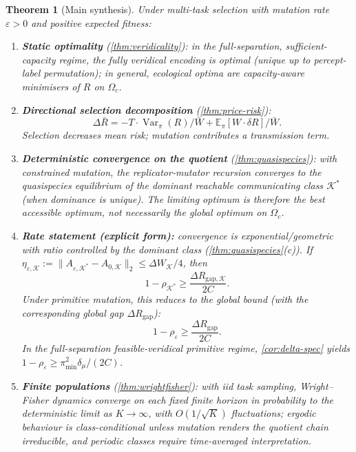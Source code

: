 \documentclass[12pt]{article}
\newtheorem{theorem}{Theorem}[section]
\newcommand{\dmu}{\delta_\mu}
\newcommand{\pimin}{\pi_{\min}}
\newcommand{\Rbar}{\bar{R}}
\newcommand{\Wbar}{\bar{W}}
\newcommand{\E}{\mathbb{E}}
\newcommand{\Var}{\operatorname{Var}}
\begin{document}
\begin{theorem}[Main synthesis]\label{thm:synthesis}
Under multi-task selection with mutation rate $\varepsilon > 0$ and positive expected fitness:

\begin{enumerate}[label=(\alph*)]
\item \textbf{Static optimality} (\cref{thm:veridicality}): in the full-separation, sufficient-capacity regime, the fully veridical encoding is optimal (unique up to percept-label permutation); in general, ecological optima are capacity-aware minimisers of $R$ on $\Omega_c$.

\item \textbf{Directional selection decomposition} (\cref{thm:price-risk}):
\[
\Delta \Rbar = -T \cdot \Var_\pi(R)/\Wbar + \E_\pi[W \cdot \delta R]/\Wbar.
\]
Selection decreases mean risk; mutation contributes a transmission term.

\item \textbf{Deterministic convergence on the quotient} (\cref{thm:quasispecies}): with constrained mutation, the replicator-mutator recursion converges to the quasispecies equilibrium of the dominant reachable communicating class $\mathcal{K}^*$ (when dominance is unique). The limiting optimum is therefore the best \emph{accessible} optimum, not necessarily the global optimum on $\Omega_c$.

\item \textbf{Rate statement (explicit form):} convergence is exponential/geometric with ratio controlled by the dominant class (\cref{thm:quasispecies}(c)). If $\eta_{\varepsilon,\mathcal{K}} := \|A_{\varepsilon,\mathcal{K}^*} - A_{0,\mathcal{K}}\|_2 \le \Delta W_\mathcal{K}/4$, then
\[
1 - \rho_{\mathcal{K}^*} \ge \frac{\Delta R_{\mathrm{gap},\mathcal{K}}}{2C}.
\]
Under primitive mutation, this reduces to the global bound (with the corresponding global gap $\Delta R_{\mathrm{gap}}$):
\[
1 - \rho_\varepsilon \ge \frac{\Delta R_{\mathrm{gap}}}{2C}.
\]
In the full-separation feasible-veridical primitive regime, \cref{cor:delta-spec} yields $1 - \rho_\varepsilon \ge \pimin^2 \dmu/(2C)$.

\item \textbf{Finite populations} (\cref{thm:wrightfisher}): with iid task sampling, Wright--Fisher dynamics converge on each fixed finite horizon in probability to the deterministic limit as $K \to \infty$, with $O(1/\sqrt{K})$ fluctuations; ergodic behaviour is class-conditional unless mutation renders the quotient chain irreducible, and periodic classes require time-averaged interpretation.
\end{enumerate}
\end{theorem}
\end{document}
